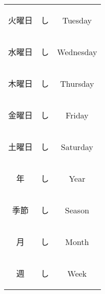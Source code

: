 \begin{center}
\begin{table}[H]
\begin{tabular}{ccc}
		{\begin{CJK}{UTF8}{min} 火曜日 \end{CJK}} & {\begin{CJK}{UTF8}{min} し \end{CJK}} & Tuesday \\
		{\begin{CJK}{UTF8}{min} 水曜日 \end{CJK}} & {\begin{CJK}{UTF8}{min} し \end{CJK}} & Wednesday \\
		{\begin{CJK}{UTF8}{min} 木曜日 \end{CJK}} & {\begin{CJK}{UTF8}{min} し \end{CJK}} & Thursday \\
		{\begin{CJK}{UTF8}{min} 金曜日 \end{CJK}} & {\begin{CJK}{UTF8}{min} し \end{CJK}} & Friday \\
		{\begin{CJK}{UTF8}{min} 土曜日 \end{CJK}} & {\begin{CJK}{UTF8}{min} し \end{CJK}} & Saturday \\
		\midrule
		{\begin{CJK}{UTF8}{min} 年 \end{CJK}} & {\begin{CJK}{UTF8}{min} し \end{CJK}} & Year \\
		{\begin{CJK}{UTF8}{min} 季節 \end{CJK}} & {\begin{CJK}{UTF8}{min} し \end{CJK}} & Season \\
		{\begin{CJK}{UTF8}{min} 月 \end{CJK}} & {\begin{CJK}{UTF8}{min} し \end{CJK}} & Month \\
		{\begin{CJK}{UTF8}{min} 週 \end{CJK}} & {\begin{CJK}{UTF8}{min} し \end{CJK}} & Week \\

\end{tabular}
\end{table}
\end{center}
